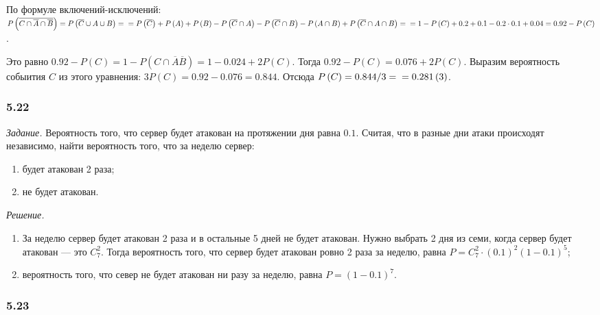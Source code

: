 По формуле включений-исключений:
$P \left( \overline{C \cap \overline{A} \cap \overline{B}} \right) =
P \left( \overline{C} \cup A \cup B \right) = \\
= P \left( \overline{C} \right) +
P \left( A \right) +
P \left( B \right) -
P \left( \overline{C} \cap A \right) -
P \left( \overline{C} \cap B \right) - P \left( A \cap B \right) + P \left( \overline{C} \cap A \cap B \right) = \\
= 1 - P \left( C \right) + 0.2 + 0.1 - 0.2 \cdot 0.1 + 0.04 =
0.92 - P \left( C \right) $.

Это равно $0.92 - P \left( C \right) = 1 - P \left( C \cap \overline{A} \overline{B} \right) = 1 - 0.024 + 2 P \left( C \right) $.
Тогда $0.92 - P \left( C \right) = 0.076 + 2 P \left( C \right) $.
Выразим вероятность собыития $C$ из этого уравнения: $3P \left( C \right) = 0.92 - 0.076 = 0.844$.
Отсюда $P \left( C \right) = 0.844/3 = \\ = 0.281 \left( 3 \right) $.

\subsubsection*{5.22}

\textit{Задание.} Вероятность того, что сервер будет атакован на протяжении дня равна $0.1$.
Считая, что в разные дни атаки происходят независимо, найти вероятность того, что за неделю сервер:
\begin{enumerate}[label=\alph*)]
\item будет атакован 2 раза;
\item не будет атакован.
\end{enumerate}

\textit{Решение.}
\begin{enumerate}[label=\alph*)]
\item За неделю сервер будет атакован 2 раза и в остальные 5 дней не будет атакован.
Нужно выбрать 2 дня из семи, когда сервер будет атакован --- это $C_7^2$.
Тогда вероятность того, что сервер будет атакован ровно 2 раза за неделю, равна
$P =
C_7^2 \cdot \left( 0.1 \right)^2 \left( 1 - 0.1 \right)^5$; 
\item вероятность того, что север не будет атакован ни разу за неделю, равна $P = \left( 1 - 0.1 \right)^7$.
\end{enumerate}

\subsubsection*{5.23}

